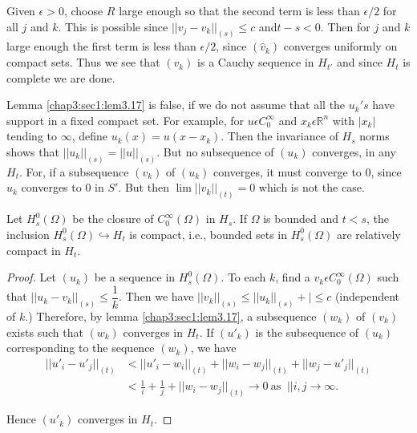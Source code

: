 Given $\epsilon > 0$, choose $R$ large enough so that the second
term is less than $\epsilon /2$ for all $j$ and $k$. This is
possible since $|| v_j - v_k||_{(s)} \leq c$ and\pageoriginale $t - s < 0$. Then for
$j$ and $k$ large enough the first term is less than $\epsilon/ 2$,
since $(\hat{v}_k)$ converges uniformly on compact sets. Thus we see
that $(v_k)$ is a Cauchy sequence in $H_{t'}$ and since $H_t$ is
complete we are done.  

\setcounter{lem}{17}
\begin{rem} \label{chap3:sec1:rem3.18}%
  Lemma \ref{chap3:sec1:lem3.17} is false, if we do not assume that all the $u_k 's $ have
  support in a fixed compact set. For example, for $u \epsilon
  C^\infty_0$ and $x_k \epsilon \mathbb{R}^n$ with $|x_k|$ tending to
  $\infty$, define $u_k(x) = u(x-x_k)$. Then the invariance of $H_s$
  norms shows that $|| u_k||_{(s)} = || u||_{(s)}$. But no subsequence
  of $(u_k)$ converges, in any $H_t$. For, if a subsequence $(v_k)$ of
  $(u_k)$ converges, it must converge to 0, since $u_k$ converges to
  $0$ in $S'$. But then $\lim || v_k ||_{(t)}=0$ which is not the case. 
\end{rem}

\setcounter{thm}{19}
\begin{thm}\label{chap3:sec1:thm3.19} %
  Let $H^0_s (\Omega)$ be the closure of
   $C^\infty _0(\Omega)$ in $H_s$. If $\Omega$ is bounded and $t < s$,
   the inclusion $H^0 _s (\Omega)\hookrightarrow H_t$ is compact,
   i.e., bounded sets in $H^0_s(\Omega)$ are relatively compact in
   $H_t$.
\end{thm}

\begin{proof}
  Let $(u_k)$ be a sequence in $H^0_s (\Omega)$. To each $k$, find a
  $v_k \epsilon C^\infty _0 (\Omega)$ such that $|| u_k-
  v_k||_{(s)}\leq \dfrac{1}{k}$. Then we have $|| v_k ||_{(s)}\leq ||
  u_k||_{(s)}+ |\leq c$ (independent of $k$.) Therefore, by
  lemma \ref{chap3:sec1:lem3.17},
  a subsequence $(w_k)$ of $(v_k)$ exists such that $(w_k)$ converges in
  $H_t$. If $(u'_k)$ is the subsequence of $(u_k)$\pageoriginale corresponding to the
  sequence $(w_k)$, we have  
  \begin{align*}
    || u'_i- u'_j||_{(t)} & < || u'_i-w_i||_{(t)} + || w_i - w_j||_{(t)} +
    || w_j- u'_j||_{(t)}\\ 
    & < \frac{1}{i}+ \frac{1}{j}+ || w_i - w_j||_{(t)} \to 0 ~\text {as }~
    || i, j \to \infty.  
  \end{align*}
  
  Hence  $(u'_k)$ converges in $H_t$. 
\end{proof}

